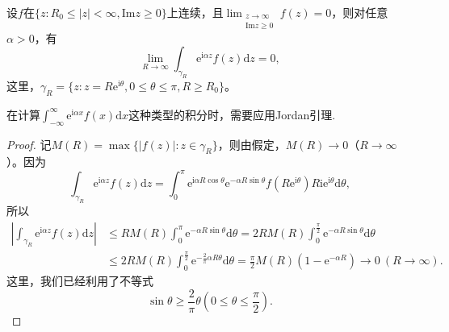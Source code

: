 \documentclass[../../main.tex]{subfiles}%
\begin{document}
\begin{lemma}[Jordan引理]\label{lemma:Jordan引理}
设$f$在$\{ z: R_0 \leqslant |z| < \infty, \mathrm{Im} z \geqslant 0 \}$上连续，且$\lim_{\substack{z \to \infty \\ \mathrm{Im} z \geqslant 0}} f(z) = 0$，则对任意$\alpha > 0$，有
\[
\lim_{R \to \infty} \int_{\gamma_R} \mathrm{e}^{\mathrm{i}\alpha z} f(z) \mathrm{d}z = 0,
\]
这里，$\gamma_R = \{ z: z = R\mathrm{e}^{\mathrm{i}\theta}, 0 \leqslant \theta \leqslant \pi, R \geqslant R_0 \}$。
\end{lemma}
\begin{remark}
在计算$\int_{-\infty}^{\infty} \mathrm{e}^{\mathrm{i}\alpha x} f(x) \mathrm{d}x$这种类型的积分时，需要应用Jordan引理.
\end{remark}
\begin{proof}
记$M(R) = \max\{ |f(z)| : z \in \gamma_R \}$，则由假定，$M(R) \to 0$（$R \to \infty$）。因为
\[
\int_{\gamma_R} \mathrm{e}^{\mathrm{i}\alpha z} f(z) \mathrm{d}z = \int_{0}^{\pi} \mathrm{e}^{\mathrm{i}\alpha R\cos\theta} \mathrm{e}^{-\alpha R\sin\theta} f(R\mathrm{e}^{\mathrm{i}\theta}) R\mathrm{i}\mathrm{e}^{\mathrm{i}\theta} \mathrm{d}\theta,
\]
所以
\begin{align*}
\left| \int_{\gamma_R} \mathrm{e}^{\mathrm{i}\alpha z} f(z) \mathrm{d}z \right| &\leqslant R M(R) \int_{0}^{\pi} \mathrm{e}^{-\alpha R\sin\theta} \mathrm{d}\theta
= 2 R M(R) \int_{0}^{\frac{\pi}{2}} \mathrm{e}^{-\alpha R\sin\theta} \mathrm{d}\theta
\\
&\leqslant 2 R M(R) \int_{0}^{\frac{\pi}{2}} \mathrm{e}^{-\frac{2}{\pi}\alpha R\theta} \mathrm{d}\theta
= \frac{\pi}{2} M(R) (1 - \mathrm{e}^{-\alpha R})
\to 0 \ (R \to \infty).
\end{align*}
这里，我们已经利用了不等式
\[
\sin\theta \geqslant \frac{2}{\pi}\theta \left( 0 \leqslant \theta \leqslant \frac{\pi}{2} \right).
\]
\end{proof}
\end{document}
